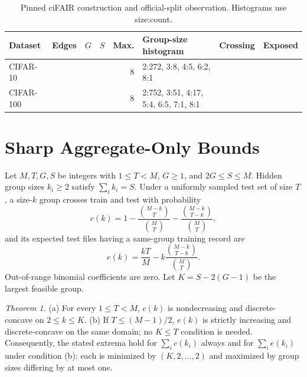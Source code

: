 \documentclass[conference,10pt]{IEEEtran}
\begin{document}
\begin{table}[t]
\caption{Pinned ciFAIR construction and official-split observation. Histograms use size:count.}
\label{tab:data}
\centering
\setlength{\tabcolsep}{5pt}
\begin{tabular}{lrrrrlrr}
\toprule
Dataset & Edges & $G$ & $S$ & Max. & Group-size histogram & Crossing & Exposed\\
\midrule
CIFAR-10 & \CifarTenEdges{} & \CifarTenGroups{} & \CifarTenFiles{} & 8 & 2:272, 3:8, 4:5, 6:2, 8:1 & \CifarTenObservedCross{} & \CifarTenObservedExposed{}\\
CIFAR-100 & \CifarHundredEdges{} & \CifarHundredGroups{} & \CifarHundredFiles{} & 8 & 2:752, 3:51, 4:17, 5:4, 6:5, 7:1, 8:1 & \CifarHundredObservedCross{} & \CifarHundredObservedExposed{}\\
\bottomrule
\end{tabular}
\end{table}

\section{Sharp Aggregate-Only Bounds}
Let $M,T,G,S$ be integers with $1\leq T<M$, $G\geq1$, and $2G\leq S\leq M$. Hidden group sizes $k_i\geq2$ satisfy $\sum_i k_i=S$. Under a uniformly sampled test set of size $T$, a size-$k$ group crosses train and test with probability
\begin{equation}
c(k)=1-\frac{\binom{M-k}{T}}{\binom MT}
-\frac{\binom{M-k}{T-k}}{\binom MT},
\end{equation}
and its expected test files having a same-group training record are
\begin{equation}
e(k)=\frac{kT}{M}-k\frac{\binom{M-k}{T-k}}{\binom MT}.
\end{equation}
Out-of-range binomial coefficients are zero. Let $K=S-2(G-1)$ be the largest feasible group.

\noindent\emph{Theorem 1.} (a) For every $1\leq T<M$, $c(k)$ is nondecreasing and discrete-concave on $2\leq k\leq K$. (b) If $T\leq(M-1)/2$, $e(k)$ is strictly increasing and discrete-concave on the same domain; no $K\leq T$ condition is needed. Consequently, the stated extrema hold for $\sum_i c(k_i)$ always and for $\sum_i e(k_i)$ under condition (b): each is minimized by $(K,2,\ldots,2)$ and maximized by group sizes differing by at most one.
\end{document}
